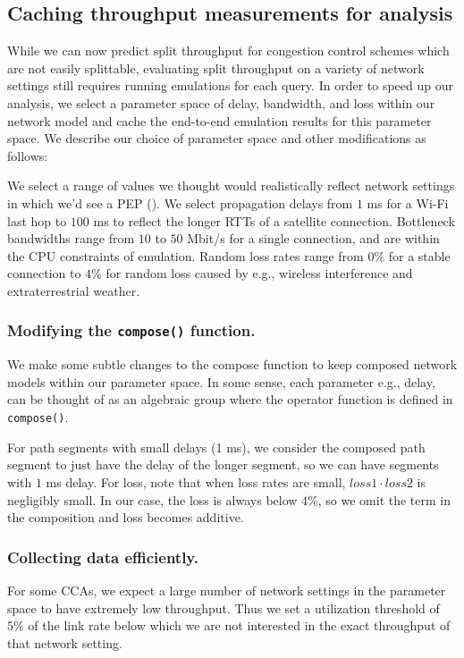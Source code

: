\subsection{Caching throughput measurements for analysis}
\label{sec:splitting:heuristic:caching}

While we can now predict split throughput for congestion control schemes which
are not easily
splittable, evaluating split throughput on a variety of network settings still
requires running emulations for each query. In order to speed up our analysis,
we select a parameter space of delay, bandwidth, and loss within our network
model and cache the end-to-end emulation results for this parameter space. We
describe our choice of parameter space and other modifications as follows:



We select a range of values we thought would realistically reflect network
settings in which we'd see a PEP (). We select propagation
delays from $1$ ms for a Wi-Fi last hop to $100$ ms to reflect the longer RTTs
of a satellite connection. Bottleneck bandwidths range from $10$ to $50$ Mbit/s
for a single connection, and are within the CPU constraints of emulation. Random
loss rates range from $0\%$ for a stable connection to $4\%$ for random loss
caused by e.g., wireless interference and extraterrestrial weather.

\subsubsection{Modifying the \texttt{compose()} function.}
We make some subtle changes to the compose function to keep composed network
models within our parameter space.
In some sense, each parameter e.g., delay, can be thought of as an algebraic
group where the operator function is defined in \texttt{compose()}.

For path segments with small delays (1 ms),
we consider the composed path segment to
just have the delay of the longer segment, so we can have segments
with $1$ ms delay. For loss, note that when loss rates are small, $loss1 \cdot
loss2$ is negligibly small. In our case, the loss is always below $4\%$, so we
omit the term in the composition and loss becomes additive.

\subsubsection{Collecting data efficiently.}
For some CCAs, we expect a large number of network settings in the parameter
space to have extremely low throughput. Thus we set a utilization threshold of
$5\%$ of the link rate below which we are not interested in the exact throughput
of that network setting.

